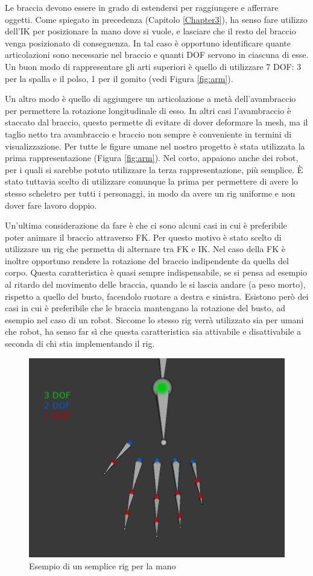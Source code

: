 Le braccia devono essere in grado di estendersi per raggiungere e afferrare oggetti.
Come spiegato in precedenza (Capitolo \ref{Chapter3}), ha senso fare utilizzo dell'IK per posizionare la mano dove si vuole, e lasciare che il resto del braccio venga posizionato di conseguenza.
In tal caso è opportuno identificare quante articolazioni sono necessarie nel braccio e quanti DOF servono in ciascuna di esse.
Un buon modo di rappresentare gli arti superiori è quello di utilizzare 7 DOF: 3 per la spalla e il polso, 1 per il gomito (vedi Figura \ref{fig:arm}).

Un altro modo è quello di aggiungere un articolazione a metà dell'avambraccio per permettere la rotazione longitudinale di esso.
In altri casi l'avambraccio è staccato dal braccio, questo permette di evitare di dover deformare la mesh, ma il taglio netto tra avambraccio e braccio non sempre è conveniente in termini di visualizzazione.
Per tutte le figure umane nel nostro progetto è stata utilizzata la prima rappresentazione (Figura \ref{fig:arm}).
Nel corto, appaiono anche dei robot, per i quali si sarebbe potuto utilizzare la terza rappresentazione, più semplice.
È stato tuttavia scelto di utilizzare comunque la prima per permettere di avere lo stesso scheletro per tutti i personaggi, in modo da avere un rig uniforme e non dover fare lavoro doppio.

Un'ultima considerazione da fare è che ci sono alcuni casi in cui è preferibile poter animare il braccio attraverso FK.
Per questo motivo è stato scelto di utilizzare un rig che permetta di alternare tra FK e IK.
Nel caso della FK è inoltre opportuno rendere la rotazione del braccio indipendente da quella del corpo.
Questa caratteristica è quasi sempre indispensabile, se si pensa ad esempio al ritardo del movimento delle braccia, quando le si lascia andare (a peso morto), rispetto a quello del busto, facendolo ruotare a destra e sinistra.
Esistono  però dei casi in cui è preferibile che le braccia mantengano la rotazione del busto, ad esempio nel caso di un robot.
Siccome lo stesso rig verrà utilizzato sia per umani che robot, ha senso far sì che questa caratteristica sia attivabile e disattivabile a seconda di chi stia implementando il rig.

\begin{figure}
\centering
\includegraphics[width=.8\textwidth]{Figures/hand}
\decoRule
\caption[Rig mano]{Esempio di un semplice rig per la mano}
\label{fig:hand}
\end{figure}

